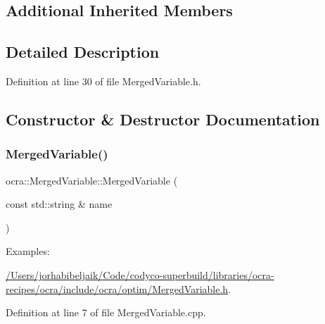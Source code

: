 \subsection*{Additional Inherited Members}


\subsection{Detailed Description}


Definition at line 30 of file Merged\+Variable.\+h.



\subsection{Constructor \& Destructor Documentation}
\hypertarget{classocra_1_1MergedVariable_ac6dcd7217ac6a6097ae95f5fe2afc513}{}\label{classocra_1_1MergedVariable_ac6dcd7217ac6a6097ae95f5fe2afc513} 
\subsubsection{\texorpdfstring{Merged\+Variable()}{MergedVariable()}}
{\footnotesize\ttfamily ocra\+::\+Merged\+Variable\+::\+Merged\+Variable (\begin{DoxyParamCaption}\item[{const std\+::string \&}]{name }\end{DoxyParamCaption})}

\begin{Desc}
\item[Examples\+: ]\par
\hyperlink{_2Users_2jorhabibeljaik_2Code_2codyco-superbuild_2libraries_2ocra-recipes_2ocra_2include_2ocra_27dfe52ed2d2fe1904154f5be9150e8b1}{/\+Users/jorhabibeljaik/\+Code/codyco-\/superbuild/libraries/ocra-\/recipes/ocra/include/ocra/optim/\+Merged\+Variable.\+h}.\end{Desc}


Definition at line 7 of file Merged\+Variable.\+cpp.

\hypertarget{classocra_1_1MergedVariable_aa126050631c068dba3e1d12f31dea9ec}{}\label{classocra_1_1MergedVariable_aa126050631c068dba3e1d12f31dea9ec} 
